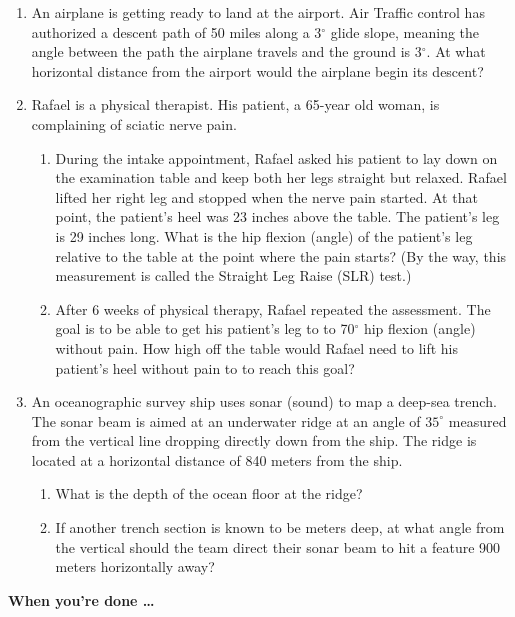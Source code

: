\begin{enumerate}
\item %
An airplane is getting ready to land at the airport.  Air Traffic control has authorized a descent path of 50 miles along a 3$^\circ$ glide slope, meaning the angle between the path the airplane travels and the ground is 3$^\circ$.  At what horizontal distance from the airport would the airplane begin its descent?

\item %
Rafael is a physical therapist.  His patient, a 65-year old woman, is complaining of sciatic nerve pain.
\begin{enumerate}
    \item During the intake appointment, Rafael asked his patient to lay down on the examination table and keep both her legs straight but relaxed.  Rafael lifted her right leg and stopped when the nerve pain started.  At that point, the patient's heel was 23 inches above the table.  The patient's leg is 29 inches long.  What is the hip flexion (angle) of the patient's leg relative to the table at the point where the pain starts? (By the way, this measurement is called the Straight Leg Raise (SLR) test.)
    \item After 6 weeks of physical therapy, Rafael repeated the assessment.  The goal is to be able to get his patient's leg to to 70$^\circ$ hip flexion (angle) without pain.  How high off the table would Rafael need to lift his patient's heel without pain to to reach this goal?
\end{enumerate}

\item %
An oceanographic survey ship uses sonar (sound) to map a deep-sea trench. The sonar beam is aimed at an underwater ridge at an angle of $35^\circ$ measured from the vertical line dropping directly down from the ship. The ridge is located at a horizontal distance of 840 meters from the ship.
\begin{enumerate}
    \item What is the depth of the ocean floor at the ridge?
    \item If another trench section is known to be  meters deep, at what angle from the vertical should the team direct their sonar beam to hit a feature 900 meters horizontally away?
\end{enumerate}

\end{enumerate}

\bigskip

\noindent \textbf{When you're done \ldots}

